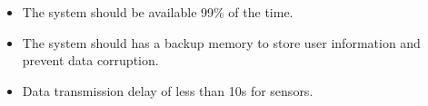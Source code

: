 \documentclass[../../main.tex]{subfiles}
\begin{document}
\begin{itemize}
    \item The system should be available 99\% of the time.
    \item The system should has a backup memory to store user information and prevent data corruption.
    \item Data transmission delay of less than 10s for sensors.


\end{itemize}
\end{document}
